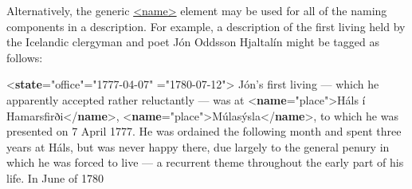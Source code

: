 Alternatively, the generic \hyperref[TEI.name]{<name>} element may be used for all of the naming components in a description. For example, a description of the first living held by the Icelandic clergyman and poet Jón Oddsson Hjaltalín might be tagged as follows: \par\bgroup{}\exampleFont \begin{shaded}\noindent\mbox{}{<\textbf{state}\hspace*{1em}{type}="{office}"\hspace*{1em}{from}="{1777-04-07}"\mbox{}\newline 
\hspace*{1em}{to}="{1780-07-12}">}\mbox{}\newline 
{}Jón's first living — which he apparently accepted rather reluctantly — was at {<\textbf{name}\hspace*{1em}{type}="{place}">}Háls í\mbox{}\newline 
\hspace*{1em}\hspace*{1em}\hspace*{1em}\hspace*{1em} Hamarsfirði{</\textbf{name}>}, {<\textbf{name}\hspace*{1em}{type}="{place}">}Múlasýsla{</\textbf{name}>}, to which he was presented on 7 April 1777. He was\mbox{}\newline 
\hspace*{1em}\hspace*{1em} ordained the following month and spent three years at Háls, but was never happy there, due largely to the general\mbox{}\newline 
\hspace*{1em}\hspace*{1em} penury in which he was forced to live — a recurrent theme throughout the early part of his life. In June of 1780\mbox{}\newline 

\end{shaded}
